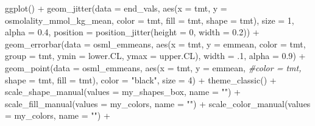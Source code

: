 \documentclass[
]{article}
\newenvironment{Shaded}{\begin{snugshade}}{\end{snugshade}}
\newcommand{\AttributeTok}[1]{\textcolor[rgb]{0.77,0.63,0.00}{#1}}
\newcommand{\CommentTok}[1]{\textcolor[rgb]{0.56,0.35,0.01}{\textit{#1}}}
\newcommand{\DecValTok}[1]{\textcolor[rgb]{0.00,0.00,0.81}{#1}}
\newcommand{\FloatTok}[1]{\textcolor[rgb]{0.00,0.00,0.81}{#1}}
\newcommand{\FunctionTok}[1]{\textcolor[rgb]{0.00,0.00,0.00}{#1}}
\newcommand{\NormalTok}[1]{#1}
\newcommand{\SpecialCharTok}[1]{\textcolor[rgb]{0.00,0.00,0.00}{#1}}
\newcommand{\StringTok}[1]{\textcolor[rgb]{0.31,0.60,0.02}{#1}}
\begin{document}
\begin{Shaded}
\begin{Highlighting}[]
\FunctionTok{ggplot}\NormalTok{() }\SpecialCharTok{+}
  \FunctionTok{geom\_jitter}\NormalTok{(}\AttributeTok{data =}\NormalTok{ end\_vals,}
              \FunctionTok{aes}\NormalTok{(}\AttributeTok{x =}\NormalTok{ tmt,}
                   \AttributeTok{y =}\NormalTok{ osmolality\_mmol\_kg\_mean, }
                   \AttributeTok{color =}\NormalTok{ tmt,}
                 \AttributeTok{fill =}\NormalTok{ tmt,}
                 \AttributeTok{shape =}\NormalTok{ tmt), }
               \AttributeTok{size =} \DecValTok{1}\NormalTok{,}
              \AttributeTok{alpha =} \FloatTok{0.4}\NormalTok{,}
              \AttributeTok{position =} \FunctionTok{position\_jitter}\NormalTok{(}\AttributeTok{height =} \DecValTok{0}\NormalTok{, }\AttributeTok{width =} \FloatTok{0.2}\NormalTok{)) }\SpecialCharTok{+}
  \FunctionTok{geom\_errorbar}\NormalTok{(}\AttributeTok{data =}\NormalTok{ osml\_emmeans,}
                \FunctionTok{aes}\NormalTok{(}\AttributeTok{x =}\NormalTok{ tmt,}
                    \AttributeTok{y =}\NormalTok{ emmean, }
                    \AttributeTok{color =}\NormalTok{ tmt,}
                    \AttributeTok{group =}\NormalTok{ tmt,}
                    \AttributeTok{ymin =}\NormalTok{ lower.CL, }
                    \AttributeTok{ymax =}\NormalTok{ upper.CL),}
                \AttributeTok{width =}\NormalTok{ .}\DecValTok{1}\NormalTok{,}
                \AttributeTok{alpha =} \FloatTok{0.9}\NormalTok{) }\SpecialCharTok{+}
  \FunctionTok{geom\_point}\NormalTok{(}\AttributeTok{data =}\NormalTok{ osml\_emmeans, }
             \FunctionTok{aes}\NormalTok{(}\AttributeTok{x =}\NormalTok{ tmt,}
                   \AttributeTok{y =}\NormalTok{ emmean, }
                   \CommentTok{\#color = tmt,}
                 \AttributeTok{shape =}\NormalTok{ tmt,}
                 \AttributeTok{fill =}\NormalTok{ tmt), }
             \AttributeTok{color =} \StringTok{"black"}\NormalTok{,}
               \AttributeTok{size =} \DecValTok{4}\NormalTok{) }\SpecialCharTok{+}
  \FunctionTok{theme\_classic}\NormalTok{() }\SpecialCharTok{+} 
  \FunctionTok{scale\_shape\_manual}\NormalTok{(}\AttributeTok{values =}\NormalTok{ my\_shapes\_box, }\AttributeTok{name =} \StringTok{""}\NormalTok{) }\SpecialCharTok{+}
  \FunctionTok{scale\_fill\_manual}\NormalTok{(}\AttributeTok{values =}\NormalTok{ my\_colors, }\AttributeTok{name =} \StringTok{""}\NormalTok{) }\SpecialCharTok{+}
  \FunctionTok{scale\_color\_manual}\NormalTok{(}\AttributeTok{values =}\NormalTok{ my\_colors, }\AttributeTok{name =} \StringTok{""}\NormalTok{) }\SpecialCharTok{+}

\end{Highlighting}
\end{Shaded}
\end{document}
